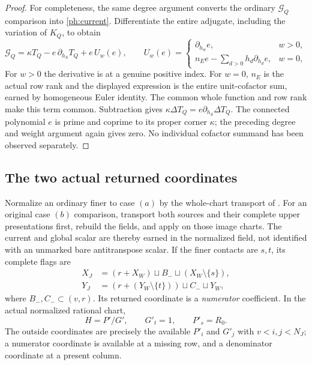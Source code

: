 \documentclass[11pt,a4paper]{amsart}
\numberwithin{equation}{section}
\theoremstyle{plain}
\theoremstyle{definition}
\begin{document}
\begin{proof}
For completeness, the same degree argument converts the ordinary
\(\mathcal G_Q\) comparison into \eqref{ph:current}.  Differentiate the
entire adjugate, including the variation of \(K_Q\), to obtain
\begin{equation}\label{ph:jacobi-current}
 \mathcal G_Q=\kappa T_Q-e\,\partial_{h_S}T_Q+e\,U_w(e),\qquad
 U_w(e)=
 \begin{cases}
 \partial_{h_w}e,&w>0,\\
 n_Ee-\sum_{d>0}h_d\partial_{h_d}e,&w=0,
 \end{cases}
\end{equation}
For \(w>0\) the derivative is at a genuine positive index.
For \(w=0\), \(n_E\) is the actual row rank and the displayed expression
is the entire unit-cofactor sum, earned by homogeneous Euler identity.
The common whole function and row rank make this term common.
Subtraction gives
\(\kappa\Delta T_Q=e\partial_{h_S}\Delta T_Q\).
The connected polynomial \(e\) is prime and coprime to its proper corner
\(\kappa\); the preceding degree and weight argument again gives zero.
No individual cofactor summand has been observed separately.
\end{proof}

\subsection{The two actual returned coordinates}
Normalize an ordinary finer to case \((a)\) by the whole-chart
transport of .  For an original case \((b)\)
comparison, transport both sources and their complete upper
presentations first, rebuild the fields, and apply
 on those image charts.
The current and global scalar are thereby earned in the normalized
field, not identified with an unmarked bare antitranspose scalar.
If the finer contacts are \(s,t\),
its complete flags are
\begin{equation}\label{ph:ordinary-flags}
 \begin{aligned}
 X_J&=(r+X_W)\sqcup B_-\sqcup(X_W\setminus\{s\}),\\
 Y_J&=(r+(Y_W\setminus\{t\}))\sqcup C_-\sqcup Y_W,
 \end{aligned}
\end{equation}
where \(B_-,C_-\subset(v,r)\).  Its returned coordinate is a
\emph{numerator} coefficient.  In the actual normalized rational chart,
\[
 H=P'/G',\qquad G'_t=1,\qquad P'_s=R_0.
\]
The outside coordinates are precisely the available \(P'_i\) and \(G'_j\)
with \(v<i,j<N_J\); a numerator coordinate is available at a missing row,
and a denominator coordinate at a present column.
\end{document}
